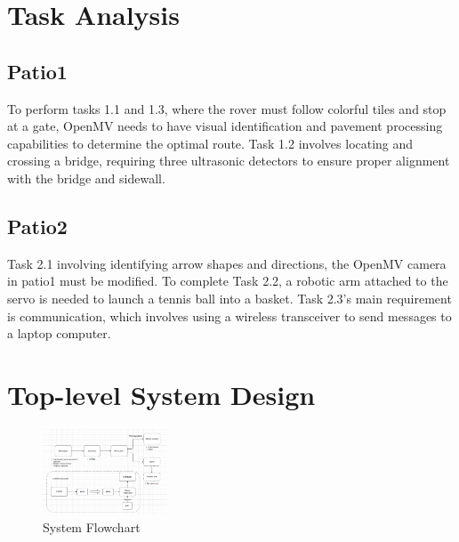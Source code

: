 \documentclass{article}
\begin{document}
\section{Task Analysis}
    \subsection{Patio1}
    To perform tasks 1.1 and 1.3, where the rover must follow colorful tiles and stop at a gate, OpenMV needs to have visual identification and pavement processing capabilities to determine the optimal route. Task 1.2 involves locating and crossing a bridge, requiring three ultrasonic detectors to ensure proper alignment with the bridge and sidewall.
    
    \subsection{Patio2}
    Task 2.1 involving identifying arrow shapes and directions, the OpenMV camera in patio1 must be modified. To complete Task 2.2, a robotic arm attached to the servo is needed to launch a tennis ball into a basket. Task 2.3's main requirement is communication, which involves using a wireless transceiver to send messages to a laptop computer.
    
\section{Top-level System Design}

\begin{figure}
    \includegraphics[width=0.33\textwidth]{figure/dia_o.png}
  \caption{System Flowchart}
  \label{diag}
\end{figure}
\end{document}
